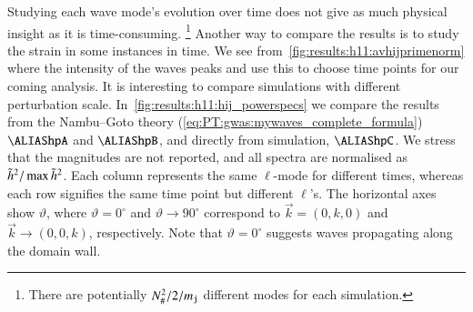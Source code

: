 

    Studying each wave mode's evolution over time does not give as much physical insight as it is time-consuming. \footnote{There are potentially $N_\#^2/2 / m_{\mathtt{j}}$ different modes for each simulation.} %
    Another way to compare the results is to study the strain in some instances in time. 
    We see from~\cref{fig:results:h11:avhijprimenorm} where the intensity of the waves peaks and use this to choose time points for our coming analysis. It is interesting to compare simulations with different perturbation scale. %
    In~\cref{fig:results:h11:hij_powerspecs} we compare the results from the Nambu--Goto theory (\cref{eq:PT:gwas:mywaves_complete_formula}) $\hpA$ and $\hpB$, %
    and directly from simulation, $\hpC$. %
    We stress that the magnitudes are not reported, and all spectra are normalised as $\tilde{h}^2/\max{\tilde{h}^2}$. Each column represents the same $\ell$-mode for different times, whereas each row signifies the same time point but different $\ell$'s. The horizontal axes show $\vartheta$, where $\vartheta=0^\circ$ and $\vartheta \to 90^\circ$ correspond to $\vec{k} =(0,k,0)$ and $\vec{k} \to (0,0,k)$, respectively. Note that $\vartheta=0^\circ$ suggests waves propagating along the domain wall.

